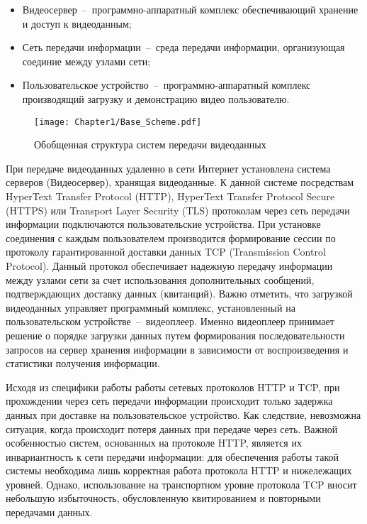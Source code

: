 \begin{itemize}
  \item Видеосервер~--~программно-аппаратный комплекс обеспечивающий хранение и доступ к видеоданным;
  \item Сеть передачи информации~--~среда передачи информации, организующая соединие между узлами сети;
  \item Пользовательское устройство~--~программно-аппаратный комплекс производящий загрузку и демонстрацию видео пользователю.
\end{itemize}

\begin{figure}[htbp]
\begin{center}
\texttt{[image: Chapter1/Base\_Scheme.pdf]}
\caption{Обобщенная структура систем передачи видеоданных}
\label{fig:Base_Scheme}
\end{center}
\end{figure}

При передаче видеоданных удаленно в сети Интернет установлена система серверов (Видеосервер), хранящая видеоданные. К данной системе посредствам HyperText Transfer Protocol (HTTP), HyperText Transfer Protocol Secure (HTTPS) или Transport Layer Security (TLS) протоколам через сеть передачи информации подключаются пользовательские устройства. При установке соединения с каждым пользователем производится формирование сессии по протоколу гарантированной доставки данных TCP (Transmission Control Protocol). Данный протокол обеспечивает надежную передачу информации между узлами сети за счет использования дополнительных сообщений, подтверждающих доставку данных (квитанций). Важно отметить, что загрузкой видеоданных управляет программный комплекс, установленный на пользовательском устройстве~--~видеоплеер. Именно видеоплеер принимает решение о порядке загрузки данных путем формирования последовательности запросов на сервер хранения информации в зависимости от воспроизведения и статистики получения информации.

Исходя из специфики работы работы сетевых протоколов HTTP и TCP, при прохождении через сеть передачи информации происходит только задержка данных при доставке на пользовательское устройство. Как следствие, невозможна ситуация, когда происходит потеря данных при передаче через сеть. Важной особенностью систем, основанных на протоколе HTTP, является их инвариантность к сети передачи информации: для обеспечения работы такой системы необходима лишь корректная работа протокола HTTP и нижележащих уровней. Однако, использование на транспортном уровне протокола TCP вносит небольшую избыточность, обусловленную квитированием и повторными передачами данных.

